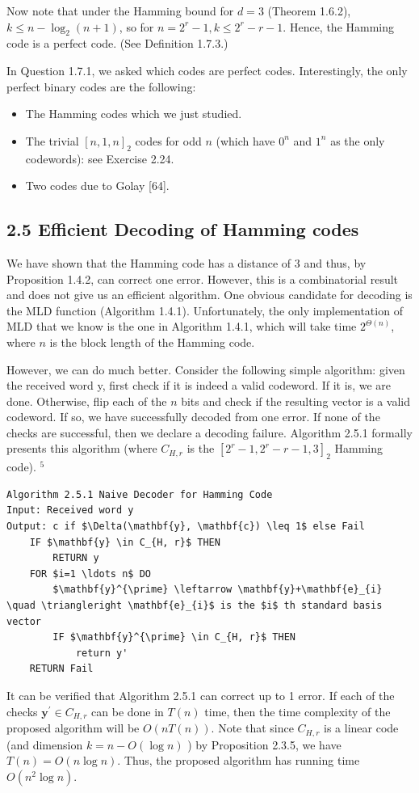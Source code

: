 \documentclass[10pt]{article}
\begin{document}
Now note that under the Hamming bound for $d=3$ (Theorem 1.6.2), $k \leq n-\log _{2}(n+1)$, so for $n=2^{r}-1, k \leq 2^{r}-r-1$. Hence, the Hamming code is a perfect code. (See Definition 1.7.3.)

In Question 1.7.1, we asked which codes are perfect codes. Interestingly, the only perfect binary codes are the following:

\begin{itemize}
  \item[-] The Hamming codes which we just studied.
  \item[-] The trivial $[n, 1, n]_{2}$ codes for odd $n$ (which have $0^{n}$ and $1^{n}$ as the only codewords): see Exercise 2.24.
  \item[-] Two codes due to Golay [64].
\end{itemize}

\subsection*{2.5 Efficient Decoding of Hamming codes}
We have shown that the Hamming code has a distance of 3 and thus, by Proposition 1.4.2, can correct one error. However, this is a combinatorial result and does not give us an efficient algorithm. One obvious candidate for decoding is the MLD function (Algorithm 1.4.1). Unfortunately, the only implementation of MLD that we know is the one in Algorithm 1.4.1, which will take time $2^{\Theta(n)}$, where $n$ is the block length of the Hamming code.

However, we can do much better. Consider the following simple algorithm: given the received word y, first check if it is indeed a valid codeword. If it is, we are done. Otherwise, flip each of the $n$ bits and check if the resulting vector is a valid codeword. If so, we have successfully decoded from one error. If none of the checks are successful, then we declare a decoding failure. Algorithm 2.5.1 formally presents this algorithm (where $C_{H, r}$ is the $\left[2^{r}-1,2^{r}-r-1,3\right]_{2}$ Hamming code). ${ }^{5}$

\begin{lstlisting}[mathescape=true]
Algorithm 2.5.1 Naive Decoder for Hamming Code
Input: Received word y
Output: c if $\Delta(\mathbf{y}, \mathbf{c}) \leq 1$ else Fail
    IF $\mathbf{y} \in C_{H, r}$ THEN
        RETURN y
    FOR $i=1 \ldots n$ DO
        $\mathbf{y}^{\prime} \leftarrow \mathbf{y}+\mathbf{e}_{i} \quad \triangleright \mathbf{e}_{i}$ is the $i$ th standard basis vector
        IF $\mathbf{y}^{\prime} \in C_{H, r}$ THEN
            return y'
    RETURN Fail
\end{lstlisting}
It can be verified that Algorithm 2.5.1 can correct up to 1 error. If each of the checks $\mathbf{y}^{\prime} \in C_{H, r}$ can be done in $T(n)$ time, then the time complexity of the proposed algorithm will be $O(n T(n))$. Note that since $C_{H, r}$ is a linear code (and dimension $k=n-O(\log n)$ ) by Proposition 2.3.5, we have $T(n)=O(n \log n)$. Thus, the proposed algorithm has running time $O\left(n^{2} \log n\right)$.
\end{document}
